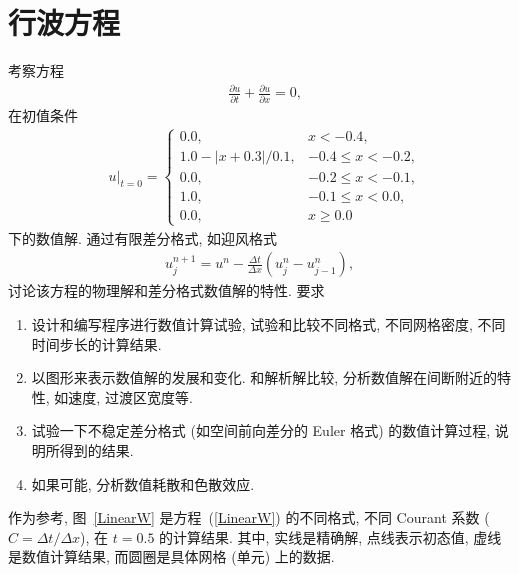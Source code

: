\documentclass[10.5pt
]{article}
\begin{document}
\section{行波方程}
考察方程
\begin{align}
& \frac{\partial u}{\partial t} + \frac{\partial u}{\partial x} = 0,
\label{EqnCon}
\end{align}
在初值条件
\begin{align}
& u|_{t=0} = \left\{\begin{array}{ll} 0.0, & x < -0.4, \\
1.0 - |x + 0.3| / 0.1, & -0.4 \le x < -0.2, \\
0.0, & -0.2 \le x < -0.1, \\
1.0 , & -0.1 \le x < 0.0, \\
0.0, & x \ge 0.0
\end{array}\right.
\end{align}
下的数值解. 通过有限差分格式, 如迎风格式
\begin{align}
u_j^{n+1} = u^n - \frac{\Delta t}{\Delta x} (u_j^n - u_{j-1}^n), \label{EqnUpwind}
\end{align}
讨论该方程的物理解和差分格式数值解的特性. 要求
\begin{enumerate}
\item
  设计和编写程序进行数值计算试验, 试验和比较不同格式, 不同网格密度, 不同时间步长的计算结果.
\item
  以图形来表示数值解的发展和变化. 和解析解比较, 分析数值解在间断附近的特性, 如速度, 过渡区宽度等.
\item
  试验一下不稳定差分格式 (如空间前向差分的 Euler 格式) 的数值计算过程, 说明所得到的结果.
\item
  如果可能, 分析数值耗散和色散效应.
\end{enumerate}

作为参考, 图~\ref{LinearW} 是方程~(\ref{LinearW}) 的不同格式, 不同 Courant 系数 ($C = \Delta t / \Delta x$), 在 $t = 0.5$ 的计算结果. 其中,
实线是精确解, 点线表示初态值, 虚线是数值计算结果, 而圆圈是具体网格 (单元) 上的数据. 
\end{document}
